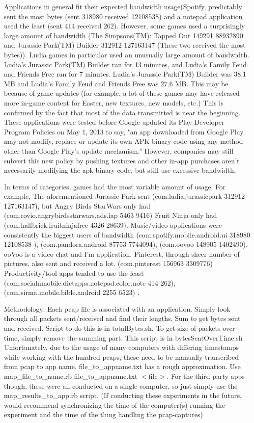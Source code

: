 Applications in general fit their expected bandwidth usage(Spotify, predictably sent the most bytes (sent 318980 received 12108538) and a notepad application used the least (sent 414 received 262). However, some games used a surprisingly large amount of bandwidth (The Simpsons(TM): Tapped Out 149291 88932890 and Jurassic Park(TM) Builder
 312912 127163147 (These two received the most bytes)). Ludia games in particular used an unusually large amount of bandwidth. Ludia's Jurassic Park(TM) Builder ran for 13 minutes, and Ludia's Family Feud and Friends Free ran for 7 minutes. Ludia's Jurassic Park(TM) Builder was 38.1 MB  and Ludia's Family Feud and Friends Free was 27.6 MB. This may be because of game updates (for example, a lot of these games may have released more in-game content for Easter, new textures, new models, etc.) This is confirmed by the fact that most of the data transmitted is near the beginning. These applications were tested before Google updated its Play Developer Program Policies on May 1, 2013 to say, "an app downloaded from Google Play may not modify, replace or update its own APK binary code using any method other than Google Play's update mechanism." However, companies may still subvert this new policy by pushing textures and other in-app purchases aren't necessarily modifying the apk binary code, but still use excessive bandwidth. 
 
In terms of categories, games had the most variable amount of usage. For example, The aforementioned Jurassic Park sent  (com.ludia.jurassicpark 312912 127163147), but Angry Birds StarWars only had (com.rovio.angrybirdsstarwars.ads.iap 5463 9416)  Fruit Ninja only had (com.halfbrick.fruitninjafree 4326 28639). Music/video applications were consistently the biggest users of bandwidth (com.spotify.mobile.android.ui 318980 12108538
), (com.pandora.android 87753 7744094), (com.oovoo 148905 1402490). ooVoo is a video chat and I'm application.  Pinterest, through sheer number of pictures, also sent and received a lot. (com.pinterest 156963 3309776) Productivity/tool apps tended to use the least (com.socialnmobile.dictapps.notepad.color.note 414 262),(com.sirma.mobile.bible.android 2255 6523) .

Methodology: Each pcap file is associated with an application. Simply look through all packets sent/received and find their lengths. Sum to get bytes sent and received. Script to do this is in totalBytes.sh. 
To get size of packets over time, simply remove the summing part. This script is in bytesSentOverTime.sh
Unfortunately, due to the usage of many computers with differing timestamps while working with the hundred pcaps, these need to be manually transcribed from pcap to app name. file_to_appname.txt has a rough approximation. Use map_file_to_name.rb file_to_appname.txt $<$file$>$.
For the third party apps though, these were all conducted on a single computer, so just simply use the map_results_to_app.rb script. (If conducting these experiments in the future, would recommend synchronizing the time of the computer(s) running the experiment and the time of the thing handling the pcap-captures)

